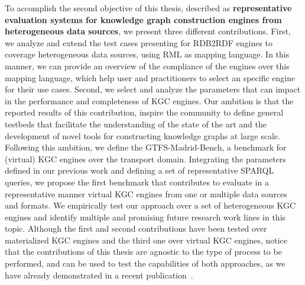 To accomplish the second objective of this thesis, described as \textbf{representative evaluation systems for knowledge graph construction engines from heterogeneous data sources}, we present three different contributions. First, we analyze and extend the test cases presenting for RDB2RDF engines to coverage heterogeneous data sources, using RML as mapping language. In this manner, we can provide an overview of the compliance of the engines over this mapping language, which help user and practitioners to select an specific engine for their use cases. Second, we select and analyze the parameters that can impact in the performance and completeness of KGC engines. Our ambition is that the reported results of this contribution, inspire the community to define general testbeds that facilitate the understanding of the state of the art and the development of novel tools for constructing knowledge graphs at large scale. Following this ambition, we define the GTFS-Madrid-Bench, a benchmark for (virtual) KGC engines over the transport domain. Integrating the parameters defined in our previous work and defining a set of representative SPARQL queries, we propose the first benchmark that contributes to evaluate in a representative manner virtual KGC engines from one or multiple data sources and formats. We empirically test our approach over a set of heterogeneous KGC engines and identify multiple and promising future research work lines in this topic. Although the first and second contributions have been tested over materialized KGC engines and the third one over virtual KGC engines, notice that the contributions of this thesis are agnostic to the type of process to be performed, and can be used to test the capabilities of both approaches, as we have already demonstrated in a recent publication~\citep{arenas2021knowledge}.


